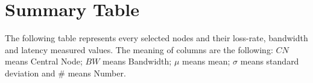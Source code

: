 \section{Summary Table}
The following table represents every selected nodes and their loss-rate,
bandwidth and latency measured values. The meaning of columns are the following:
$CN$ means Central Node; $BW$ means Bandwidth; $\mu$ means mean; $\sigma$ means
standard deviation and $\#$ means Number.


\begin{landscape}
%   
 
\end{landscape}
